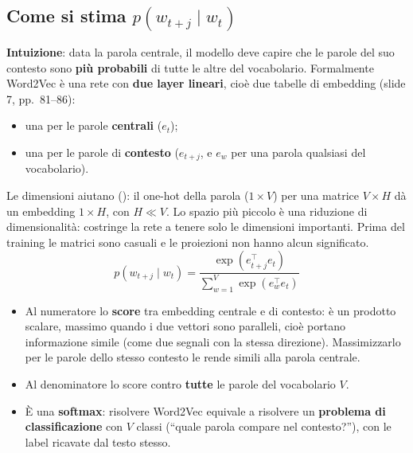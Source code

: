 \subsection{Come si stima \texorpdfstring{$p(w_{t+j} \mid w_t)$}{p(w\_t+j | w\_t)}}
\textbf{Intuizione}: data la parola centrale, il modello deve capire che le parole del suo contesto sono \textbf{più probabili} di tutte
le altre del vocabolario. Formalmente Word2Vec è una rete con \textbf{due layer lineari}, cioè due tabelle di embedding (slide 7,
pp.~81--86):
\begin{itemize}
  \item una per le parole \textbf{centrali} ($e_t$);
  \item una per le parole di \textbf{contesto} ($e_{t+j}$, e $e_w$ per una parola qualsiasi del vocabolario).
\end{itemize}
Le dimensioni aiutano (): il one-hot della parola ($1 \times V$) per una matrice $V \times H$ dà un embedding
$1 \times H$, con $H \ll V$. Lo spazio più piccolo è una riduzione di dimensionalità: costringe la rete a tenere solo le dimensioni
importanti. Prima del training le matrici sono casuali e le proiezioni non hanno alcun significato.
\[
  p(w_{t+j} \mid w_t) = \frac{\exp\!\left(e_{t+j}^{\top} e_t\right)}{\sum_{w=1}^{V} \exp\!\left(e_w^{\top} e_t\right)}
\]
\begin{itemize}
  \item Al numeratore lo \textbf{score} tra embedding centrale e di contesto: è un prodotto scalare, massimo quando i due vettori sono
        paralleli, cioè portano informazione simile (come due segnali con la stessa direzione). Massimizzarlo per le parole dello stesso
        contesto le rende simili alla parola centrale.
  \item Al denominatore lo score contro \textbf{tutte} le parole del vocabolario $V$.
  \item È una \textbf{softmax}: risolvere Word2Vec equivale a risolvere un \textbf{problema di classificazione} con $V$ classi
        (``quale parola compare nel contesto?''), con le label ricavate dal testo stesso.
\end{itemize}

